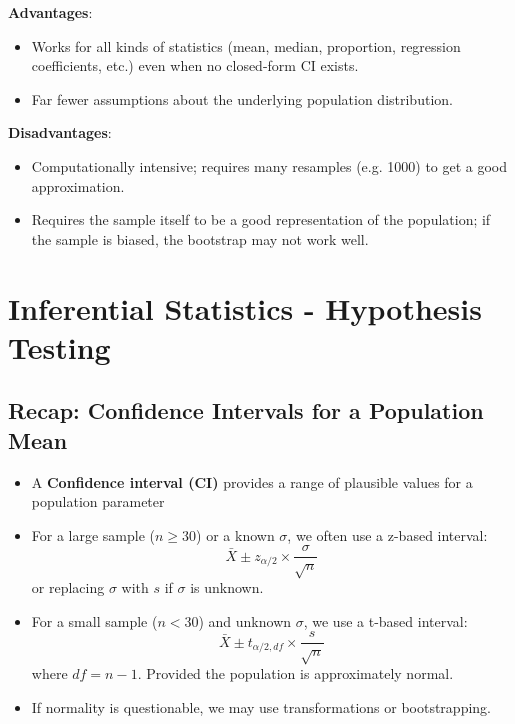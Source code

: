 \documentclass[9pt]{extarticle}
\begin{document}
\textbf{Advantages}:
\begin{itemize}
    \item Works for all kinds of statistics (mean, median, proportion, regression coefficients, etc.) even when no closed-form CI exists.
    \item Far fewer assumptions about the underlying population distribution.
\end{itemize}
\textbf{Disadvantages}:
\begin{itemize}
    \item Computationally intensive; requires many resamples (e.g. 1000) to get a good approximation.
    \item Requires the sample itself to be a good representation of the population; if the sample is biased, the bootstrap may not work well.
\end{itemize}
\section{Inferential Statistics - Hypothesis Testing}
\subsection*{Recap: Confidence Intervals for a Population Mean}
\vfill
\begin{itemize}
    \item A \textbf{Confidence interval (CI)} provides a range of plausible values for a population parameter
    \item For a large sample ($n \geq 30$) or a known $\sigma$, we often use a z-based interval:
    $$\bar{X} \pm z_{\alpha/2} \times \frac{\sigma}{\sqrt{n}}$$
    or replacing $\sigma$ with $s$ if $\sigma$ is unknown.
    \item For a small sample ($n < 30$) and unknown $\sigma$, we use a t-based interval:
    $$\bar{X} \pm t_{\alpha/2, df} \times \frac{s}{\sqrt{n}}$$
    where $df = n - 1$. Provided the population is approximately normal.
    \item If normality is questionable, we may use transformations or bootstrapping. 
\end{itemize}
\vfill
\end{document}
